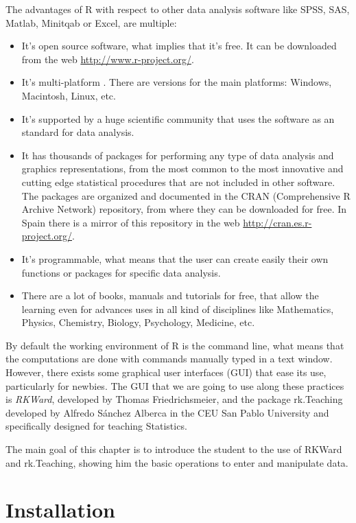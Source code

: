 The advantages of R with respect to other data analysis software like SPSS, SAS, Matlab, Minitqab or Excel, are
multiple:
\begin{itemize}
\item It's open source software, what implies that it's free. 
It can be downloaded from the web \url{http://www.r-project.org/}.
\item It's multi-platform .
There are versions for the main platforms: Windows, Macintosh, Linux, etc. 
\item It's supported by a huge scientific community that uses the software as an standard for data analysis. 
\item It has thousands of packages for performing any type of data analysis and graphics representations, from the most
common to the most innovative and cutting edge statistical procedures that are not included in other software. 
The packages are organized and documented in the CRAN (Comprehensive R Archive Network) repository, from where they
can be downloaded for free. 
In Spain there is a mirror of this repository in the web \url{http://cran.es.r-project.org/}.
\item It's programmable, what means that the user can create easily their own functions or packages for specific data
analysis.
\item There are a lot of books, manuals and tutorials for free, that allow the learning even for advances uses
in all kind of disciplines like Mathematics, Physics, Chemistry, Biology, Psychology, Medicine, etc. 
\end{itemize}

By default the working environment of R is the command line, what means that the computations are done with commands
manually typed in a text window.
However, there exists some graphical user interfaces (GUI) that ease its use, particularly for newbies.
The GUI that we are going to use along these practices is \emph{RKWard}, developed by Thomas
Friedrichsmeier, and the package rk.Teaching developed by Alfredo Sánchez Alberca in the CEU San Pablo
University and specifically designed for teaching Statistics.

The main goal of this chapter is to introduce the student to the use of RKWard and rk.Teaching, showing him the basic
operations to enter and manipulate data.

\section{Installation}
